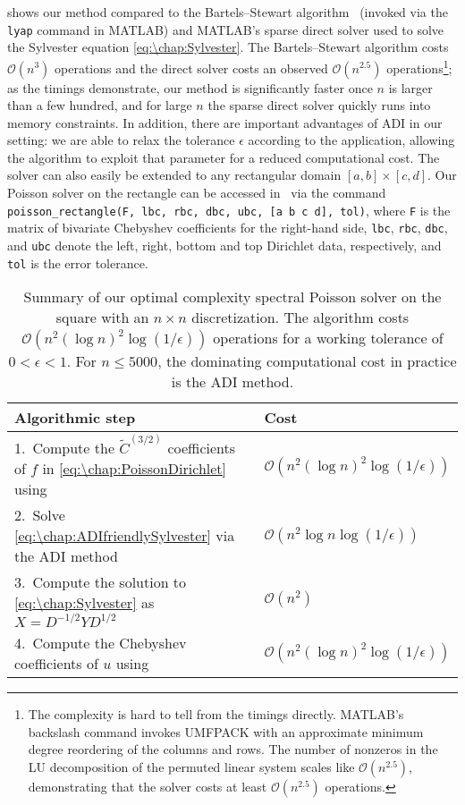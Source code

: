  shows our method compared to the Bartels--Stewart algorithm~\cite{Bartels_72_01} (invoked via the \texttt{lyap} command in MATLAB) and MATLAB's sparse direct solver used to solve the Sylvester equation \cref{eq:\chap:Sylvester}. The Bartels--Stewart algorithm costs $\mathcal{O}(n^3)$ operations and the direct solver costs an observed $\mathcal{O}(n^{2.5})$ operations\footnote{The complexity is hard to tell from the timings directly. MATLAB's backslash command invokes UMFPACK with an approximate minimum degree reordering of the columns and rows. The number of nonzeros in the LU decomposition of the permuted linear system scales like $\mathcal{O}(n^{2.5})$, demonstrating that the solver costs at least $\mathcal{O}(n^{2.5})$ operations.}; as the timings demonstrate, our method is significantly faster once $n$ is larger than a few hundred, and for large $n$ the sparse direct solver quickly runs into memory constraints. In addition, there are important advantages of ADI in our setting: we are able to relax the tolerance $\epsilon$ according to the application, allowing the algorithm to exploit that parameter for a reduced  computational cost. The solver can also easily be extended to any rectangular domain $[a,b]\times[c,d]$. Our Poisson solver on the rectangle can be accessed in~\cite{GithubRepoPoisson} via the command \texttt{poisson\_rectangle(F, lbc, rbc, dbc, ubc, [a b c d], tol)}, where \texttt{F} is the matrix of bivariate Chebyshev coefficients for the right-hand side, \texttt{lbc}, \texttt{rbc}, \texttt{dbc}, and \texttt{ubc} denote the left, right, bottom and top Dirichlet data, respectively, and \texttt{tol} is the error tolerance.

\begin{table} 
\centering
\caption{Summary of our optimal complexity spectral Poisson solver on the square with an $n\times n$ discretization. The algorithm costs $\mathcal{O}(n^2(\log n)^2\log(1/\epsilon))$ operations for a working tolerance of $0<\epsilon<1$. For $n\leq 5000$, the dominating computational cost in practice is the ADI method.}
\begin{tabular}{ll} 
\hline
\rule{0pt}{3ex}Algorithmic step & Cost \\[2pt] 
\hline 
\rule{0pt}{3ex}1.~Compute the $\tilde{C}^{(3/2)}$ coefficients of $f$ in \cref{eq:\chap:PoissonDirichlet} using~\cite{Townsend_18_01} & $\mathcal{O}(n^2 (\log n)^2\log(1/\epsilon))$ \\[5pt] 
2.~Solve \cref{eq:\chap:ADIfriendlySylvester} via the ADI method  & $\mathcal{O}(n^2 \log n \log(1/\epsilon))$ \\[5pt] 
3.~Compute the solution to \cref{eq:\chap:Sylvester} as $X = D^{-1/2}Y D^{1/2}$ & $\mathcal{O}(n^2)$ \\[5pt] 
4.~Compute the Chebyshev coefficients of $u$ using~\cite{Townsend_18_01} & $\mathcal{O}(n^2 (\log n)^2 \log(1/\epsilon))$\\[5pt] 
\hline
\end{tabular} 
\label{tab:\chap:AlgorithmSummary} 
\end{table} 

